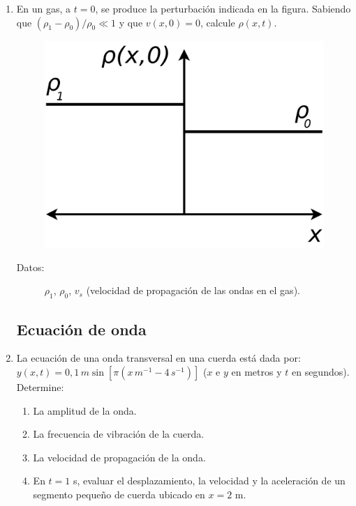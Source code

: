 \documentclass[11pt,spanish,a4paper]{article}
\begin{document}
\begin{enumerate}
\item En un gas, a $t=0$, se produce la perturbación indicada en la figura.
Sabiendo que $(\rho_{1}-\rho_{0})/\rho_{0}\ll1$ y que $v(x,0)=0$,
calcule $\rho(x,t)$.
\begin{figure}[H]
\centering{}\includegraphics[clip,scale=0.25]{ej2-5}
\end{figure}
\begin{description}
\item [{Datos:}] $\rho_{1}$, $\rho_{0}$, $v_{s}$ (velocidad de propagación
de las ondas en el gas).
\end{description}


\subsection*{Ecuación de onda}

\item La ecuación de una onda transversal en una cuerda está dada por: $y(x,t)=0,1\unit{\, m}\sin\left[\pi\left(x\unit{\, m^{-1}-4\unit{\, s^{-1}}}\right)\right]$
($x$ e $y$ en metros y $t$ en segundos). Determine:
\begin{enumerate}
\item La amplitud de la onda.
\item La frecuencia de vibración de la cuerda.
\item La velocidad de propagación de la onda.
\item En $t=1$ s, evaluar el desplazamiento, la velocidad y la aceleración
de un segmento pequeño de cuerda ubicado en $x=2$ m.
\end{enumerate}



\end{enumerate}
\end{document}
